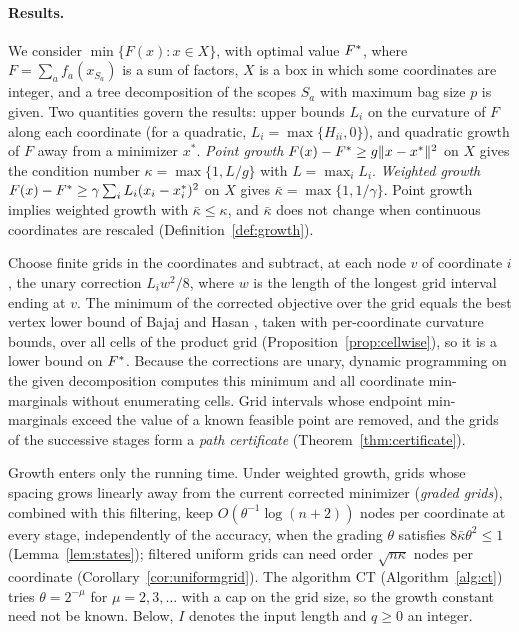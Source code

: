 \paragraph{Results.}\label{sec:intro-results}
We consider $\min\{F(x):x\in X\}$, with optimal value $F^{*}$, where
$F=\sum_af_a(x_{S_a})$ is a sum of factors, $X$ is a box in which some
coordinates are integer, and a tree decomposition of the scopes $S_a$ with
maximum bag size $p$ is given. Two quantities govern the results: upper bounds
$L_i$ on the curvature of $F$ along each coordinate (for a quadratic,
$L_i=\max\{H_{ii},0\}$), and quadratic growth of $F$ away from a minimizer
$x^*$. \emph{Point growth} $F(x)-F^{*}\ge g\lVert x-x^*\rVert^2$ on $X$ gives the
condition number $\kappa=\max\{1,L/g\}$ with $L=\max_iL_i$. \emph{Weighted
growth} $F(x)-F^{*}\ge\gamma\sum_iL_i(x_i-x_i^*)^2$ on $X$ gives
$\bar\kappa=\max\{1,1/\gamma\}$. Point growth implies weighted growth with
$\bar\kappa\le\kappa$, and $\bar\kappa$ does not change when continuous
coordinates are rescaled (Definition~\ref{def:growth}).

Choose finite grids in the coordinates and subtract, at each node $v$ of
coordinate $i$, the unary correction $L_iw^2/8$, where $w$ is the length of the
longest grid interval ending at $v$. The minimum of the corrected objective
over the grid equals the best vertex lower bound of Bajaj and Hasan
\cite{BajajHasan2020}, taken with per-coordinate curvature bounds, over all
cells of the product grid (Proposition~\ref{prop:cellwise}), so it is a lower
bound on $F^{*}$. Because the corrections are unary, dynamic programming on
the given decomposition computes this minimum and all coordinate
min-marginals without enumerating cells. Grid intervals whose
endpoint min-marginals exceed the value of a known feasible point are
removed, and the grids of the successive stages form a \emph{path
certificate} (Theorem~\ref{thm:certificate}).

Growth enters only the running time. Under weighted growth, grids whose
spacing grows linearly away from the current corrected minimizer
(\emph{graded grids}), combined with this filtering, keep
$O(\theta^{-1}\log(n+2))$ nodes per coordinate at every stage, independently
of the accuracy, when the grading $\theta$ satisfies $8\bar\kappa\theta^2\le1$
(Lemma~\ref{lem:states}); filtered uniform grids can need order
$\sqrt{n\kappa}$ nodes per coordinate (Corollary~\ref{cor:uniformgrid}).
The algorithm CT (Algorithm~\ref{alg:ct}) tries
$\theta=2^{-\mu}$ for $\mu=2,3,\dots$ with a cap on the grid size, so the
growth constant need not be known. Below, $I$ denotes the input length and
$q\ge0$ an integer.

